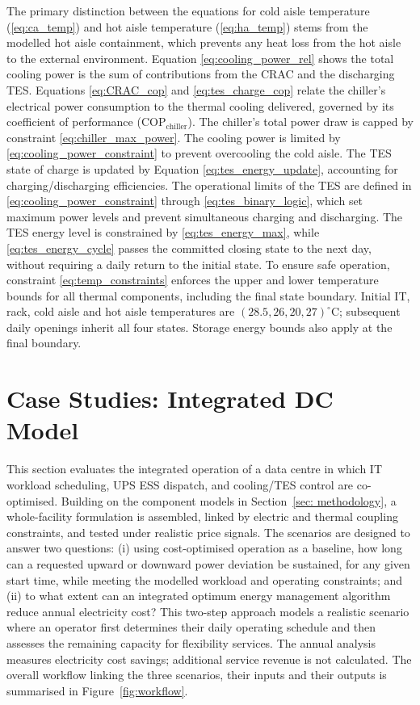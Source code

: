 \documentclass[lettersize,journal]{IEEEtran}
\newcommand{\rev}[1]{#1}
\begin{document}
The primary distinction between the equations for cold aisle temperature (\ref{eq:ca_temp}) and hot aisle temperature (\ref{eq:ha_temp}) stems from the modelled hot aisle containment, which prevents any heat loss from the hot aisle to the external environment. Equation \eqref{eq:cooling_power_rel} shows the total cooling power is the sum of contributions from the CRAC and the discharging TES. Equations \eqref{eq:CRAC_cop} and \eqref{eq:tes_charge_cop} relate the chiller's electrical power consumption to the thermal cooling delivered, governed by its coefficient of performance ($\mathrm{COP}_{\mathrm{chiller}}$). The chiller's total power draw is capped by constraint \eqref{eq:chiller_max_power}. The cooling power is limited by \eqref{eq:cooling_power_constraint} to prevent overcooling the cold aisle. The TES state of charge is updated by Equation \eqref{eq:tes_energy_update}, accounting for charging/discharging efficiencies. The operational limits of the TES are defined in \eqref{eq:cooling_power_constraint} through \eqref{eq:tes_binary_logic}, which set maximum power levels and prevent simultaneous charging and discharging. The TES energy level is constrained by \eqref{eq:tes_energy_max}, while \eqref{eq:tes_energy_cycle} passes the committed closing state to the next day, without requiring a daily return to the initial state.
To ensure safe operation, constraint \eqref{eq:temp_constraints} enforces the upper and lower temperature bounds for all thermal components, including the final state boundary. Initial IT, rack, cold aisle and hot aisle temperatures are $(28.5,26,20,27)^\circ$C; subsequent daily openings inherit all four states. Storage energy bounds also apply at the final boundary.
 

\section{Case Studies: Integrated DC Model}\label{sec:integrated_model and case studies}

This section evaluates the integrated operation of a data centre in which IT workload scheduling, UPS ESS dispatch, and cooling/TES control are co-optimised. Building on the component models in Section~\ref{sec: methodology}, a whole-facility formulation is assembled, linked by electric and thermal coupling constraints, and tested under realistic price signals. The scenarios are designed to answer two questions: (i) using cost-optimised operation as a baseline, how long can a requested upward or downward power deviation be sustained, for any given start time, while meeting the modelled workload and operating constraints; and (ii) to what extent can an integrated optimum energy management algorithm reduce annual electricity cost? This two-step approach models a realistic scenario where an operator first determines their daily operating schedule and then assesses the remaining capacity for flexibility services. The annual analysis measures electricity cost savings; additional service revenue is not calculated. \rev{The overall workflow linking the three scenarios, their inputs and their outputs is summarised in Figure~\ref{fig:workflow}.}
\end{document}
